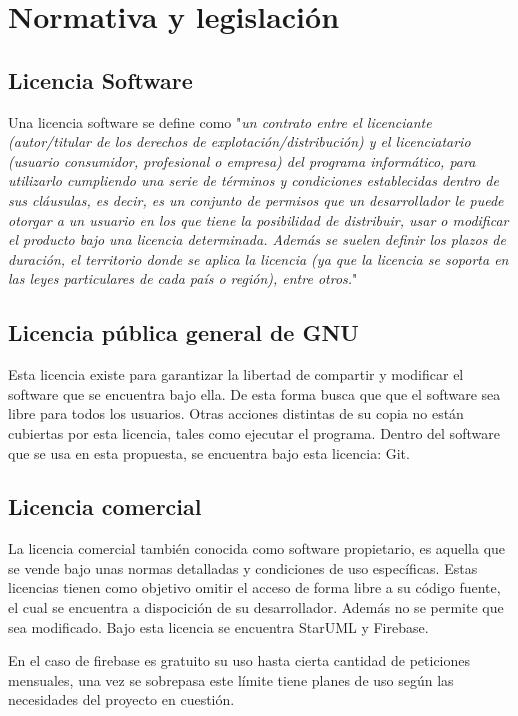 \section{Normativa y legislación}

\subsection{Licencia Software}
Una licencia software se define como "\textit{un contrato entre el
licenciante (autor/titular de los derechos de explotación/distribución) y el
licenciatario (usuario consumidor, profesional o empresa) del programa
informático, para utilizarlo cumpliendo una serie de términos y condiciones
establecidas dentro de sus cláusulas,​ es decir, es un conjunto de permisos
que un desarrollador le puede otorgar a un usuario en los que tiene la
posibilidad de distribuir, usar o modificar el producto bajo una licencia
determinada. Además se suelen definir los plazos de duración, el territorio
donde se aplica la licencia (ya que la licencia se soporta en las leyes
particulares de cada país o región), entre otros.}" \cite{licencia}


\subsection{Licencia pública general de GNU}
Esta licencia \cite{GNU} existe para garantizar la libertad de compartir y modificar el
software que se encuentra bajo ella. De esta forma busca que que el software
sea libre para todos los usuarios. Otras acciones distintas de su copia no
están cubiertas por esta licencia, tales como ejecutar el programa. Dentro del
software que se usa en esta propuesta, se encuentra bajo esta licencia: Git.

\subsection{Licencia comercial}
La licencia comercial también conocida como software propietario, es aquella que
se vende bajo unas normas detalladas y condiciones de uso específicas. Estas
licencias tienen como objetivo omitir el acceso de forma libre a su código fuente,
el cual se encuentra a dispocición de su desarrollador. Además no se permite que
sea modificado. Bajo esta licencia se encuentra StarUML y Firebase.

En el caso de firebase es gratuito su uso hasta cierta cantidad de peticiones
mensuales, una vez se sobrepasa este límite tiene planes de uso según las
necesidades del proyecto en cuestión.

